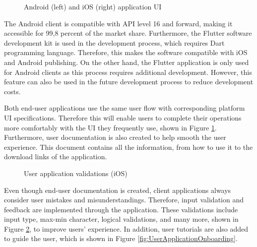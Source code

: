 \begin{figure}[htbp]
\centering
{}
\caption{Android (left) and iOS (right) application UI}
\label{fig:UserApplicationUI}
\end{figure}

The Android client is compatible with API level 16 and forward, making it accessible for 99,8 percent of the market share. Furthermore, the Flutter software development kit is used in the development process, which requires Dart programming language. Therefore, this makes the software compatible with iOS and Android publishing. On the other hand, the Flutter application is only used for Android clients as this process requires additional development. However, this feature can also be used in the future development process to reduce development costs.

Both end-user applications use the same user flow with corresponding platform UI specifications. Therefore this will enable users to complete their operations more comfortably with the UI they frequently use, shown in Figure \ref{fig:UserApplicationUI}. Furthermore, user documentation is also created to help smooth the user experience. This document contains all the information, from how to use it to the download links of the application. 

\begin{figure}[htbp]
\centering
{}
\caption{User application validations (iOS)}
\label{fig:UserApplicationValidations}
\end{figure}

Even though end-user documentation is created, client applications always consider user mistakes and misunderstandings. Therefore, input validation and feedback are implemented through the application. These validations include input type, max-min character, logical validations, and many more, shown in Figure \ref{fig:UserApplicationValidations}, to improve users' experience. In addition, user tutorials are also added to guide the user, which is shown in Figure \ref{fig:UserApplicationOnboarding}.


